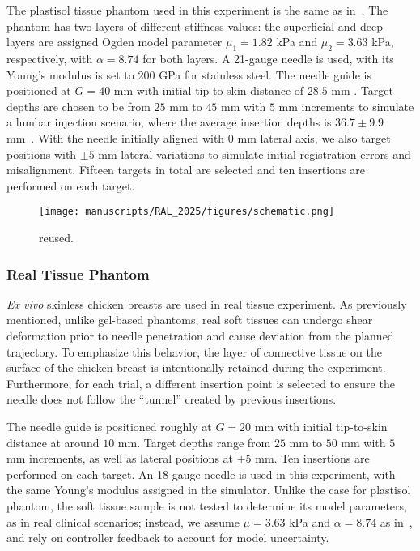 The plastisol tissue phantom used in this experiment is the same as in~\parencite{wangSimulationbasedFlexibleNeedle2024}. The phantom has two layers of different stiffness values: the superficial and deep layers are assigned Ogden model parameter $\mu_1 = 1.82$ kPa and $\mu_2 = 3.63$ kPa, respectively, with $\alpha = 8.74$ for both layers. A 21-gauge needle is used, with its Young's modulus is set to 200 GPa for stainless steel. The needle guide is positioned at $G=40$ mm with initial tip-to-skin distance of $28.5$ mm . Target depths are chosen to be from $25$ mm to $45$ mm with $5$ mm increments to simulate a lumbar injection scenario, where the average insertion depths is $36.7 \pm 9.9$ mm~\parencite{fritzAugmentedRealityVisualization2012}. With the needle initially aligned with $0$ mm lateral axis, we also target positions with $\pm 5$ mm lateral variations to simulate initial registration errors and misalignment. Fifteen targets in total are selected and ten insertions are performed on each target. 

\begin{figure}[h]
  \centering
  \texttt{[image: manuscripts/RAL\_2025/figures/schematic.png]}
  \caption{ reused.}
  \label{fig:chap-5-simulator-re}
\end{figure}

\subsubsection{Real Tissue Phantom}
\label{sec:chap--5-real-tissue}

\textit{Ex vivo} skinless chicken breasts are used in real tissue experiment. As previously mentioned, unlike gel-based phantoms, real soft tissues can undergo shear deformation prior to needle penetration and cause deviation from the planned trajectory. To emphasize this behavior, the layer of connective tissue on the surface of the chicken breast is intentionally retained during the experiment. Furthermore, for each trial, a different insertion point is selected to ensure the needle does not follow the ``tunnel'' created by previous insertions.

The needle guide is positioned roughly at $G=20$ mm with initial tip-to-skin distance at around $10$ mm. Target depths range from $25$ mm to $50$ mm with $5$ mm increments, as well as lateral positions at $\pm5$ mm. Ten insertions are performed on each target. An 18-gauge needle is used in this experiment, with the same Young's modulus assigned in the simulator. Unlike the case for plastisol phantom, the soft tissue sample is not tested to determine its model parameters, as in real clinical scenarios; instead, we assume $\mu=3.63$ kPa and $\alpha=8.74$ as in~\parencite{moVitroCompressiveProperties2020}, and rely on controller feedback to account for model uncertainty.

